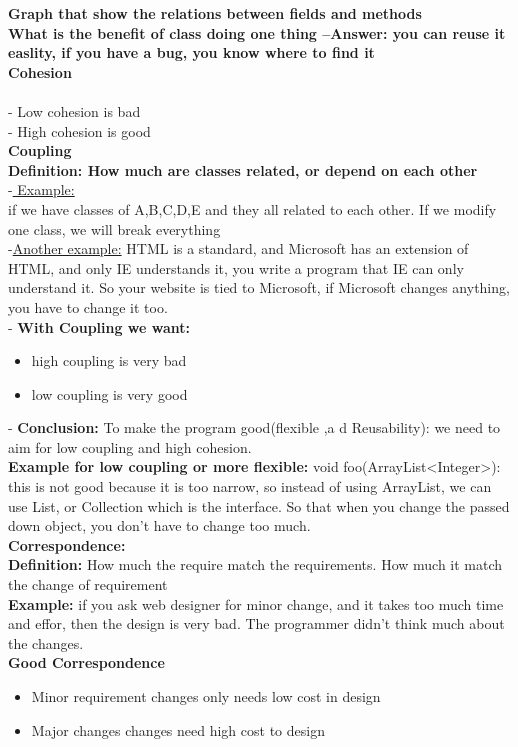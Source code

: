 \documentclass{article}
\begin{document}
\textbf{Graph that show the relations between fields and methods}\\

\textbf{ What is the benefit of class doing one thing --Answer: you can reuse it
easlity, if you have a bug, you know where to find it}\\

\textbf{Cohesion}\\
\\
- Low cohesion is bad\\
- High cohesion is good\\

\textbf{Coupling}\\
\textbf{Definition: How much are classes related, or depend on each other}\\
-\underline{ Example:}\\
if we have classes of A,B,C,D,E and they all related to each other. If we modify
one class, we will break everything\\
-\underline{Another example:} HTML is a standard, and Microsoft has an extension
of HTML, and only IE understands it, you write a program that IE can only
understand it. So your website is tied to Microsoft, if Microsoft changes
anything, you have to change it too.\\
- \textbf{With Coupling we want:}
\begin{itemize}
  \item high coupling is very bad
  \item low coupling is very good
\end{itemize}

- \textbf{Conclusion:} To make the program good(flexible ,a d Reusability): we
need to aim for low coupling and high cohesion.\\

\textbf{Example for low coupling or more flexible:} void
foo(ArrayList<Integer>):
this is not good because it is too narrow, so instead of using ArrayList, we can use List, or Collection which
is the interface. So that when you change the passed down object, you don't have
to change too much.\\

\textbf{Correspondence:}\\
\textbf{Definition:} How much the require match the requirements. How much it
match the change of requirement\\
\textbf{Example:} if you ask web designer for minor change, and it takes too
much time and effor, then the design is very bad. The programmer didn't think
much about the changes.\\
\textbf{ Good Correspondence}\\
\begin{itemize}
\item Minor requirement changes only needs low cost in design\\
\item Major changes changes need high cost to design\\
\end{itemize}
\end{document}
